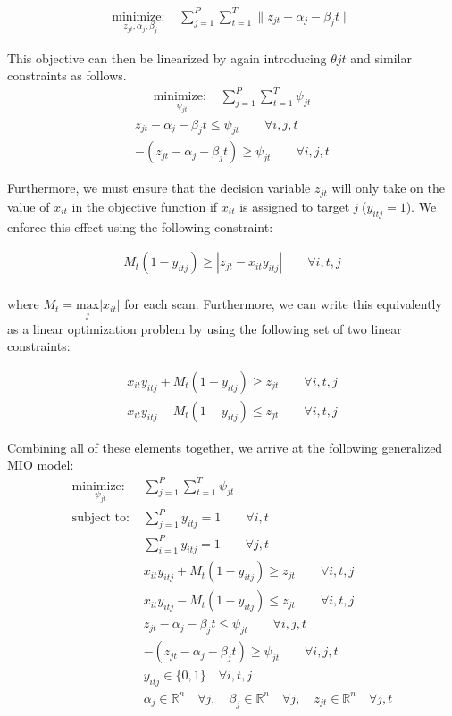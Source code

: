 \begin{align}\label{eq:generalized_objective}
\underset{z_{jt}, \alpha_{j}, \beta_{j}}{\text{minimize: }} & \sum_{j=1}^{P} \sum_{t=1}^{T} \|z_{jt} - \alpha_{j} - \beta_{j}t\|
\end{align}

This objective can then be linearized by again introducing $\theta{jt}$ and similar constraints as follows. 
\begin{align}\label{eq:generalized_linear_objective}
\underset{\psi_{jt}}{\text{minimize: }} & \sum_{j=1}^{P} \sum_{t=1}^{T} \psi_{jt}
\end{align}
\begin{align}
z_{jt} - \alpha_{j} - \beta_{j}t \leq \psi_{jt} \qquad \forall i,j,t\\
-(z_{jt} - \alpha_{j} - \beta_{j}t) \geq \psi_{jt} \qquad \forall i,j,t
\end{align}
 
Furthermore, we must ensure that the decision variable $z_{jt}$ will only take on the value of $x_{it}$ in the objective function if $x_{it}$ is assigned to target \textit{j} ($y_{itj} = 1$). We enforce this effect using the following constraint:

\begin{align}
M_{t}(1-y_{itj}) \geq |z_{jt} - x_{it}y_{itj}| \qquad \forall i,t,j\\
\end{align}

where $M_{t} = \underset{j}{\text{max}}|x_{it}|$ for each scan. Furthermore, we can write this equivalently as a linear optimization problem by using the following set of two linear constraints:

\begin{align}
x_{it}y_{itj} + M_{t}(1-y_{itj}) \geq z_{jt} \qquad \forall i,t,j\\
x_{it}y_{itj} - M_{t}(1-y_{itj}) \leq z_{jt} \qquad \forall i,t,j
\end{align}

Combining all of these elements together, we arrive at the following generalized MIO model:
\begin{align*}
\underset{\psi_{jt}}{\text{minimize: }} & \sum_{j=1}^{P} \sum_{t=1}^{T} \psi_{jt} \\
\text{subject to: }	& \sum_{j=1}^{P} y_{itj} = 1 \qquad \forall i,t\\
				& \sum_{i=1}^{P} y_{itj} = 1 \qquad \forall j,t\\
				& x_{it}y_{itj} + M_{t}(1-y_{itj}) \geq z_{jt} \qquad \forall i,t,j\\
				& x_{it}y_{itj} - M_{t}(1-y_{itj}) \leq z_{jt} \qquad \forall i,t,j\\
				& z_{jt} - \alpha_{j} - \beta_{j}t \leq \psi_{jt} \qquad \forall i,j,t\\
				& -(z_{jt} - \alpha_{j} - \beta_{j}t) \geq \psi_{jt} \qquad \forall i,j,t\\
			 	& y_{itj} \in \{0,1\} \quad \forall i,t,j\\
				& \alpha_{j} \in \mathbb{R}^n \quad \forall j,\quad \beta_{j} \in \mathbb{R}^n \quad \forall j, \quad z_{jt} \in \mathbb{R}^n \quad \forall j,t
\end{align*}
